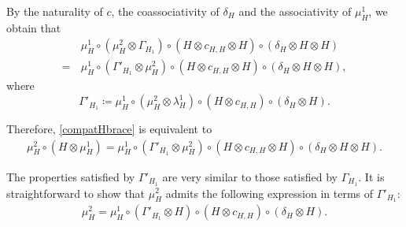 \documentclass[11pt,reqno]{amsart}
\theoremstyle{plain}%
\theoremstyle{definition}
\theoremstyle{remark}
\begin{document}
By the naturality of $c$, the coassociativity of $\delta_{H}$ and the associativity of $\mu_{H}^{1}$, we obtain that
\begin{align*}
	&\mu_{H}^{1}\circ(\mu_{H}^{2}\otimes\Gamma_{H_{1}})\circ(H\otimes c_{H,H}\otimes H)\circ(\delta_{H}\otimes H\otimes H)\\=\,&\mu_{H}^{1}\circ(\Gamma'_{H_{1}}\otimes\mu_{H}^{2})\circ(H\otimes c_{H,H}\otimes H)\circ(\delta_{H}\otimes H\otimes H),
\end{align*}
where \begin{equation}\label{GammaprimadefH1}\Gamma'_{H_{1}}\coloneqq \mu_{H}^{1}\circ(\mu_{H}^{2}\otimes\lambda_{H}^{1})\circ(H\otimes c_{H,H})\circ(\delta_{H}\otimes H).\end{equation}

Therefore, \eqref{compatHbrace} is equivalent to
\begin{gather}\label{compatHprimabrace}
\mu_{H}^{2}\circ(H\otimes\mu_{H}^{1})=\mu_{H}^{1}\circ(\Gamma'_{H_{1}}\otimes\mu_{H}^{2})\circ(H\otimes c_{H,H}\otimes H)\circ(\delta_{H}\otimes H\otimes H).
\end{gather}

The properties satisfied by $\Gamma'_{H_{1}}$ are very similar to those satisfied by $\Gamma_{H_{1}}$. It is straightforward to show that $\mu_{H}^{2}$ admits the following expression in terms of $\Gamma'_{H_{1}}$:
\begin{gather}\label{mu2prime-exp}
	\mu_{H}^{2}=\mu_{H}^{1}\circ(\Gamma'_{H_{1}}\otimes H)\circ(H\otimes c_{H,H})\circ(\delta_{H}\otimes H).
\end{gather}
\end{document}

